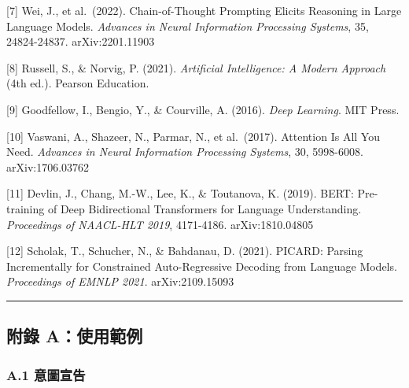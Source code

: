 {[}7{]} Wei, J., et al.~(2022). Chain-of-Thought Prompting Elicits
Reasoning in Large Language Models. \emph{Advances in Neural Information
Processing Systems}, 35, 24824-24837. arXiv:2201.11903

{[}8{]} Russell, S., \& Norvig, P. (2021). \emph{Artificial
Intelligence: A Modern Approach} (4th ed.). Pearson Education.

{[}9{]} Goodfellow, I., Bengio, Y., \& Courville, A. (2016). \emph{Deep
Learning}. MIT Press.

{[}10{]} Vaswani, A., Shazeer, N., Parmar, N., et al.~(2017). Attention
Is All You Need. \emph{Advances in Neural Information Processing
Systems}, 30, 5998-6008. arXiv:1706.03762

{[}11{]} Devlin, J., Chang, M.-W., Lee, K., \& Toutanova, K. (2019).
BERT: Pre-training of Deep Bidirectional Transformers for Language
Understanding. \emph{Proceedings of NAACL-HLT 2019}, 4171-4186.
arXiv:1810.04805

{[}12{]} Scholak, T., Schucher, N., \& Bahdanau, D. (2021). PICARD:
Parsing Incrementally for Constrained Auto-Regressive Decoding from
Language Models. \emph{Proceedings of EMNLP 2021}. arXiv:2109.15093

\begin{center}\rule{0.5\linewidth}{0.5pt}\end{center}

\subsection{附錄
A：使用範例}\label{ux9644ux9304-aux4f7fux7528ux7bc4ux4f8b}

\subsubsection{A.1 意圖宣告}\label{a.1-ux610fux5716ux5ba3ux544a}

\begin{Shaded}
\begin{Highlighting}[]
\NormalTok{(}\NormalTok{)}
 \NormalTok{) }\OperatorTok{{-}\textgreater{}} \NormalTok{:}
     
\end{Highlighting}
\end{Shaded}

